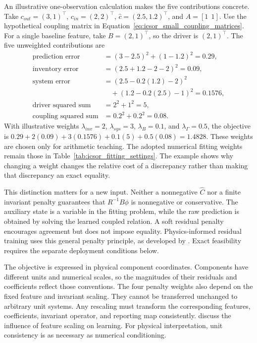An illustrative one-observation calculation makes the five contributions concrete. Take \(c_{out}=(3,1)^\top\), \(c_{in}=(2,2)^\top\), \(\widehat c=(2.5,1.2)^\top\), and \(A=[1\ \ 1]\). Use the hypothetical coupling matrix in Equation~\eqref{eq:icsor_small_coupling_matrices}. For a single baseline feature, take \(B=(2,1)^\top\), so the driver is \((2,1)^\top\). The five unweighted contributions are
\begin{equation}
\label{eq:icsor_penalty_numbers}
\begin{aligned}
\text{prediction error}&=(3-2.5)^2+(1-1.2)^2=0.29,\\
\text{inventory error}&=(2.5+1.2-2-2)^2=0.09,\\
\text{system error}&=(2.5-0.2(1.2)-2)^2\\
&\quad +(1.2-0.2(2.5)-1)^2=0.1576,\\
\text{driver squared sum}&=2^2+1^2=5,\\
\text{coupling squared sum}&=0.2^2+0.2^2=0.08.
\end{aligned}
\end{equation}
With illustrative weights \(\lambda_{inv}=2\), \(\lambda_{sys}=3\), \(\lambda_B=0.1\), and \(\lambda_{\Gamma}=0.5\), the objective is \(0.29+2(0.09)+3(0.1576)+0.1(5)+0.5(0.08)=1.4828\). These weights are chosen only for arithmetic teaching. The adopted numerical fitting weights remain those in Table~\ref{tab:icsor_fitting_settings}. The example shows why changing a weight changes the relative cost of a discrepancy rather than making that discrepancy an exact equality.

This distinction matters for a new input. Neither a nonnegative \(\widehat C\) nor a finite invariant penalty guarantees that \(R^{-1}B\phi\) is nonnegative or conservative. The auxiliary state is a variable in the fitting problem, while the raw prediction is obtained by solving the learned coupled relation. A soft residual penalty encourages agreement but does not impose equality. Physics-informed residual training uses this general penalty principle, as developed by \citet{Raissi2019}. Exact feasibility requires the separate deployment conditions below.

The objective is expressed in physical component coordinates. Components have different units and numerical scales, so the magnitudes of their residuals and coefficients reflect those conventions. The four penalty weights also depend on the fixed feature and invariant scaling. They cannot be transferred unchanged to arbitrary unit systems. Any rescaling must transform the corresponding features, coefficients, invariant operator, and reporting map consistently. \citet{Pinheiro2025} discuss the influence of feature scaling on learning. For physical interpretation, unit consistency is as necessary as numerical conditioning.

